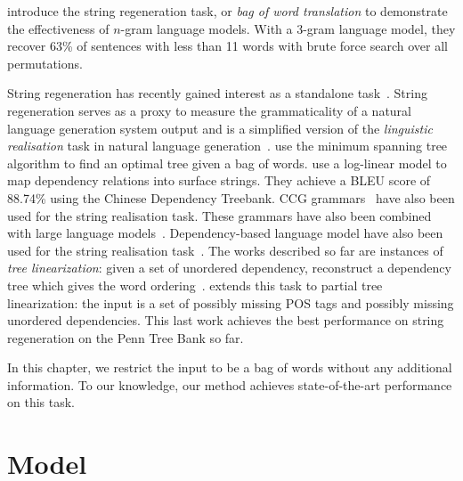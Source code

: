 \citet{brown-cocke-dellapietra-dellapietra-jelinek-lafferty-mercer-roossin:1990:CL}
introduce the string regeneration task, or \emph{bag of word translation}
to demonstrate the effectiveness
of $n$-gram language models. With a 3-gram language model, they recover
63\% of sentences with less than 11 words with brute force search
over all permutations.

String regeneration has recently gained interest as
a standalone
task~\citep{wan-dras-dale-paris:2009:EACL,he-wang-guo-liu:2009:ACLIJCNLP,zhang-clark:2011:EMNLP,zhang-blackwood-clark:2012:EACL2012,zhang:2013:IJCAI}.
String regeneration serves as a proxy to measure the grammaticality of a
natural language generation system output and is a simplified version
of the \emph{linguistic realisation} task in natural language
generation~\citep{reiter:1997:JNLE}.
\citet{wan-dras-dale-paris:2009:EACL} use the minimum spanning tree algorithm
to find an optimal tree given a bag of words.
\citet{he-wang-guo-liu:2009:ACLIJCNLP} use a log-linear model to map
dependency relations into surface strings. They achieve a BLEU
score of 88.74\% using the Chinese Dependency Treebank.
CCG grammars~\citep{zhang-clark:2011:EMNLP} have also been used
for the string realisation task. These grammars have also
been combined with large language
models~\citep{zhang-blackwood-clark:2012:EACL2012}.
Dependency-based language model have also been used for the
string realisation task~\citep{guo-wang-vanGenabith:2011:JNLE}.
The works described so far are instances of \emph{tree linearization}: given
a set of unordered dependency, reconstruct a dependency tree which gives
the word ordering~\citep{belz-bohnet-mille-wanner-white:2012:INLG}.
\citet{zhang:2013:IJCAI} extends this task to partial tree linearization: the
input is a set of possibly missing POS tags and possibly missing unordered
dependencies. This last work achieves the best performance on string regeneration
on the Penn Tree Bank so far.

In this chapter, we restrict the input to be a bag of words without any additional
information. To our knowledge, our method achieves state-of-the-art performance
on this task.


\section{Model}

